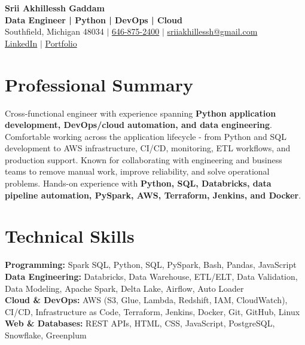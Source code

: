 \documentclass[letterpaper,10pt]{article}
\begin{document}
\fontsize{9.35pt}{10.45pt}\selectfont

\begin{center}
    {\LARGE \textbf{Srii Akhillessh Gaddam}} \\[-1pt]
    \textbf{Data Engineer | Python | DevOps | Cloud} \\[2pt]
    Southfield, Michigan 48034 $|$
    \href{tel:6468752400}{646-875-2400} $|$
    \href{mailto:sriiakhillessh@gmail.com}{sriiakhillessh@gmail.com} \\[1pt]
    \href{https://www.linkedin.com/in/srii-akhiilessh-gaddam-b48668191/}{LinkedIn} $|$
    \href{https://sriiakhillesshg.github.io/portfolio/}{Portfolio}
\end{center}
\vspace{-8pt}

\section{Professional Summary}
\small{Cross-functional engineer with experience spanning \textbf{Python application development, DevOps/cloud automation, and data engineering}. Comfortable working across the application lifecycle - from Python and SQL development to AWS infrastructure, CI/CD, monitoring, ETL workflows, and production support. Known for collaborating with engineering and business teams to remove manual work, improve reliability, and solve operational problems. Hands-on experience with \textbf{Python, SQL, Databricks, data pipeline automation, PySpark, AWS, Terraform, Jenkins, and Docker}.}

\section{Technical Skills}
\small{
\textbf{Programming:} Spark SQL, Python, SQL, PySpark, Bash, Pandas, JavaScript \\
\textbf{Data Engineering:} Databricks, Data Warehouse, ETL/ELT, Data Validation, Data Modeling, Apache Spark, Delta Lake, Airflow, Auto Loader \\
\textbf{Cloud \& DevOps:} AWS (S3, Glue, Lambda, Redshift, IAM, CloudWatch), CI/CD, Infrastructure as Code, Terraform, Jenkins, Docker, Git, GitHub, Linux \\
\textbf{Web \& Databases:} REST APIs, HTML, CSS, JavaScript, PostgreSQL, Snowflake, Greenplum
}
\end{document}

